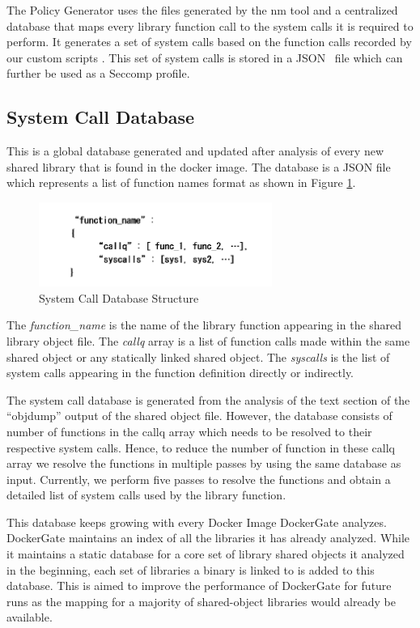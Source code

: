 The Policy Generator uses the files generated by the nm tool and a centralized database that maps every library function call to the system calls it is required to perform. It generates a set of system calls based on the function calls recorded by our custom scripts . This set of system calls is stored in a JSON~\cite{json} file which can further be used as a Seccomp profile.

\subsection{System Call Database}
This is a global database generated and updated after analysis of every new shared library that is found in the docker image. The database is a JSON file which represents a list of function names format as shown in Figure \ref{fig:syscall_db}. 

\begin{figure}[t]
  \centering
  \includegraphics[width=3in]{figs/syscalldb}
  \caption{System Call Database Structure}
  \label{fig:syscall_db}
\end{figure}

The \textit{function\_name} is the name of the library function appearing in the shared library object file. The \textit{callq} array is a list of function calls made within the same shared object or any statically linked shared object. The \textit{syscalls} is the list of system calls appearing in the function definition directly or indirectly. 

The system call database is generated from the analysis of the text section of the “objdump” output of the shared object file. However, the database consists of number of functions in the callq array which needs to be resolved to their respective system calls. Hence, to reduce the number of function in these callq array we resolve the functions in multiple passes by using the same database as input. Currently, we perform five passes to resolve the functions and obtain a detailed list of system calls used by the library function.

This database keeps growing with every Docker Image DockerGate analyzes. DockerGate maintains an index of all the libraries it has already analyzed. While it maintains a static database for a core set of library shared objects it analyzed in the beginning, each set of libraries a binary is linked to is added to this database. This is aimed to improve the performance of DockerGate for future runs as the mapping for a majority of shared-object libraries would already be available.

